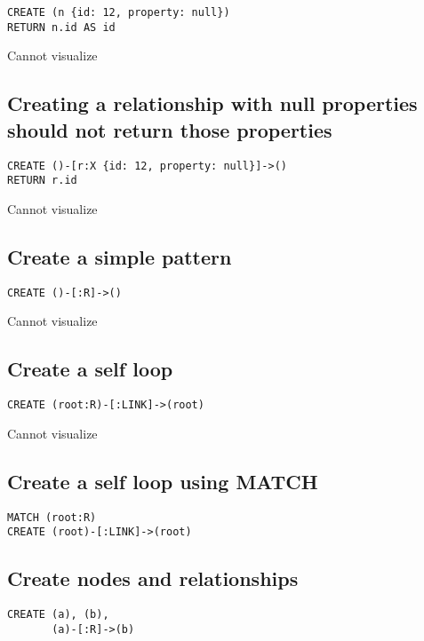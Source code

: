 \begin{lstlisting}
CREATE (n {id: 12, property: null})
RETURN n.id AS id
\end{lstlisting}

Cannot visualize
\subsection{Creating a relationship with null properties should not return those properties}

\begin{lstlisting}
CREATE ()-[r:X {id: 12, property: null}]->()
RETURN r.id
\end{lstlisting}

Cannot visualize
\subsection{Create a simple pattern}

\begin{lstlisting}
CREATE ()-[:R]->()
\end{lstlisting}

Cannot visualize
\subsection{Create a self loop}

\begin{lstlisting}
CREATE (root:R)-[:LINK]->(root)
\end{lstlisting}

Cannot visualize
\subsection{Create a self loop using MATCH}

\begin{lstlisting}
MATCH (root:R)
CREATE (root)-[:LINK]->(root)
\end{lstlisting}

\subsection{Create nodes and relationships}

\begin{lstlisting}
CREATE (a), (b),
       (a)-[:R]->(b)
\end{lstlisting}

